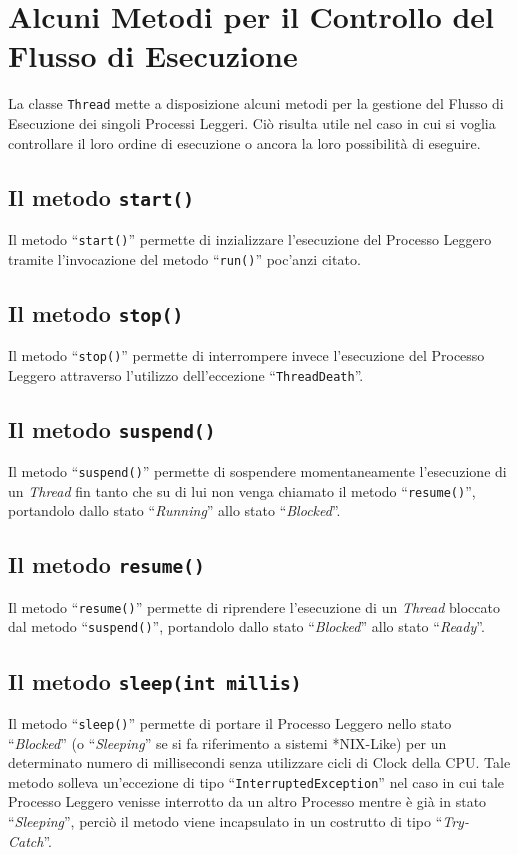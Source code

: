 \section[Controllo del Flusso di Esecuzione]{Alcuni Metodi per il Controllo del Flusso di Esecuzione}
La classe \texttt{Thread} mette a disposizione alcuni metodi per la gestione del Flusso di Esecuzione dei singoli Processi Leggeri\cite{SeminarioJavaDispense}. Ciò risulta utile nel caso in cui si voglia controllare il loro ordine di esecuzione o ancora la loro possibilità di eseguire. \par
\subsection*{Il metodo \texttt{start()}}
Il metodo ``\texttt{start()}'' permette di inzializzare l'esecuzione del Processo Leggero tramite l'invocazione del metodo ``\texttt{run()}'' poc'anzi citato.
\subsection*{Il metodo \texttt{stop()}}
Il metodo ``\texttt{stop()}'' permette di interrompere invece l'esecuzione del Processo Leggero attraverso l'utilizzo dell'eccezione ``\texttt{ThreadDeath}''.
\subsection*{Il metodo \texttt{suspend()}}
Il metodo ``\texttt{suspend()}'' permette di sospendere momentaneamente l'esecuzione di un \textit{Thread} fin tanto che su di lui non venga chiamato il metodo ``\texttt{resume()}'', portandolo dallo stato ``\textit{Running}'' allo stato ``\textit{Blocked}''.
\subsection*{Il metodo \texttt{resume()}}
Il metodo ``\texttt{resume()}'' permette di riprendere l'esecuzione di un \textit{Thread} bloccato dal metodo ``\texttt{suspend()}'', portandolo dallo stato ``\textit{Blocked}'' allo stato ``\textit{Ready}''.
\subsection*{Il metodo \texttt{sleep(int millis)}}
Il metodo ``\texttt{sleep()}'' permette di portare il Processo Leggero nello stato ``\textit{Blocked}'' (o ``\textit{Sleeping}'' se si fa riferimento a sistemi *NIX-Like) per un determinato numero di millisecondi senza utilizzare cicli di Clock della CPU. Tale metodo solleva un'eccezione di tipo ``\texttt{InterruptedException}'' nel caso in cui tale Processo Leggero venisse interrotto da un altro Processo mentre è già in stato ``\textit{Sleeping}'', perciò il metodo viene incapsulato in un costrutto di tipo ``\textit{Try-Catch}''.
